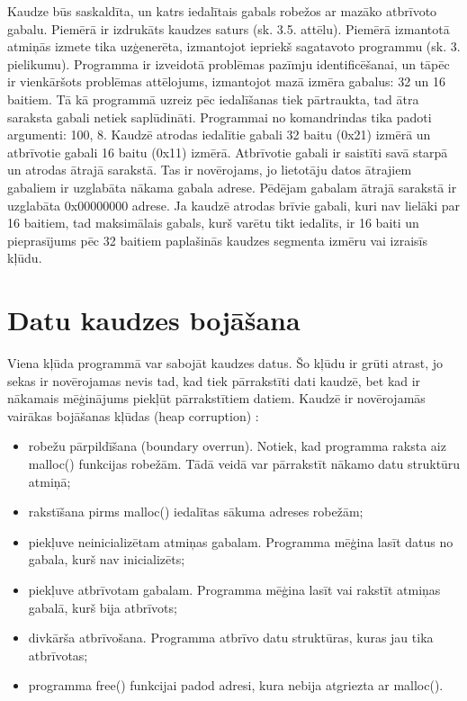 Kaudze būs saskaldīta, un katrs iedalītais gabals robežos ar mazāko atbrīvoto gabalu.
Piemērā ir izdrukāts kaudzes saturs (sk. 3.5. attēlu).
Piemērā izmantotā atmiņās izmete tika uzģenerēta, izmantojot iepriekš sagatavoto programmu (sk. 3. pielikumu).
Programma ir izveidotā problēmas pazīmju identificēšanai, un tāpēc ir vienkāršots problēmas attēlojums, izmantojot mazā izmēra gabalus: 32 un 16 baitiem.
Tā kā programmā uzreiz pēc iedalīšanas tiek pārtraukta, tad ātra saraksta gabali netiek saplūdināti.
Programmai no komandrindas tika padoti argumenti: 100, 8.
Kaudzē atrodas iedalītie gabali 32 baitu (0x21) izmērā un atbrīvotie gabali 16 baitu (0x11) izmērā.
Atbrīvotie gabali ir saistīti savā starpā un atrodas ātrajā sarakstā.
Tas ir novērojams, jo lietotāju datos ātrajiem gabaliem ir uzglabāta nākama gabala adrese.
Pēdējam gabalam ātrajā sarakstā ir uzglabāta 0x00000000 adrese.
Ja kaudzē atrodas brīvie gabali, kuri nav lielāki par 16 baitiem, tad maksimālais gabals, kurš varētu tikt iedalīts, ir 16 baiti un pieprasījums pēc 32 baitiem paplašinās kaudzes segmenta izmēru vai izraisīs kļūdu.

\section{Datu kaudzes bojāšana}

Viena kļūda programmā var sabojāt kaudzes datus. 
Šo kļūdu ir grūti atrast, jo sekas ir novērojamas nevis tad, kad tiek pārrakstīti dati kaudzē, bet kad ir nākamais mēģinājums piekļūt pārrakstītiem datiem.
Kaudzē ir novērojamās vairākas bojāšanas kļūdas (heap corruption) \cite{DHC}:
\begin{itemize}
\item robežu pārpildīšana (boundary overrun). Notiek, kad programma raksta aiz malloc() funkcijas robežām.
Tādā veidā var pārrakstīt nākamo datu struktūru atmiņā; 
\item rakstīšana pirms malloc() iedalītas sākuma adreses robežām;
\item piekļuve neinicializētam atmiņas gabalam. Programma mēģina lasīt datus no gabala, kurš nav inicializēts;
\item piekļuve atbrīvotam gabalam. Programma mēģina lasīt vai rakstīt atmiņas gabalā, kurš bija atbrīvots;
\item divkārša atbrīvošana. Programma atbrīvo datu struktūras, kuras jau tika atbrīvotas;
\item programma free() funkcijai padod adresi, kura nebija atgriezta ar malloc().
\end{itemize}



